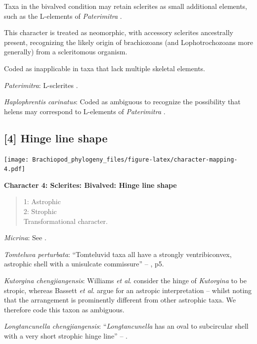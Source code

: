 \documentclass[]{book}
\theoremstyle{definition}
\theoremstyle{definition}
\theoremstyle{definition}
\theoremstyle{remark}
\begin{document}
Taxa in the bivalved condition may retain sclerites as small additional
elements, such as the L-elements of \emph{Paterimitra}
\citep{Skovsted2015Theearly}.

This character is treated as neomorphic, with accessory sclerites
ancestrally present, recognizing the likely origin of brachiozoans (and
Lophotrochozoans more generally) from a scleritomous organism.

Coded as inapplicable in taxa that lack multiple skeletal elements.

\emph{Paterimitra}: L-sclerites \citep{Skovsted2009Thescleritome}.

\emph{Haplophrentis carinatus}: Coded as ambiguous to recognize the
possibility that helens may correspond to L-elements of
\emph{Paterimitra} \citep{Moysiuk2017Hyolithsare}.

\hypertarget{hinge-line-shape}{%
\subsection*{{[}4{]} Hinge line shape}\label{hinge-line-shape}}

\texttt{[image: Brachiopod\_phylogeny\_files/figure-latex/character-mapping-4.pdf]}

\textbf{Character 4: Sclerites: Bivalved: Hinge line shape}

\begin{quote}
1: Astrophic\\
2: Strophic\\
Transformational character.
\end{quote}

\emph{Micrina}: See \citet{Holmer2008TheEarly}.

\emph{Tomteluva perturbata}: ``Tomteluvid taxa all have a strongly
ventribiconvex, astrophic shell with a unisulcate commissure'' --
\citet{Streng2016Anew}, p5.

\emph{Kutorgina chengjiangensis}: Williams \emph{et al}.
\citeyearpar[p.~208]{Williams2000BrachiopodaLinguliformea} consider the
hinge of \emph{Kutorgina} to be stropic, whereas Bassett \emph{et al}.
\citeyearpar{Bassett2001Functionalmorphology} argue for an astropic
interpretation -- whilst noting that the arrangement is prominently
different from other astrophic taxa. We therefore code this taxon as
ambiguous.

\emph{Longtancunella chengjiangensis}: ``\emph{Longtancunella} has an
oval to subcircular shell with a very short strophic hinge line'' --
\citet{Zhang2011Theexceptionally}.
\end{document}

